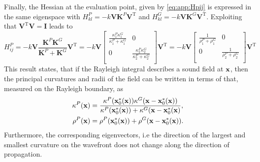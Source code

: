 Finally, the Hessian at the evaluation point, given by \eqref{eq:app:Hpij} is expressed in the same eigenspace with $H^P_{kl} = -k \mathbf{V} \mathbf{K}^P \mathbf{V}^{\mathrm{T}}$ and $H^G_{kl} = -k \mathbf{V} \mathbf{K}^G \mathbf{V}^{\mathrm{T}}$.
Exploiting that $\mathbf{V}^{\mathrm{T}}\mathbf{V} = \mathbf{I}$ leads to
\begin{equation}
H_{ij}^P = 
-k \mathbf{V} \frac{ \mathbf{K}^P \mathbf{K}^G  }{\mathbf{K}^P + \mathbf{K}^G }   \mathbf{V}^{\mathrm{T}} =
-k \mathbf{V} 
\begin{bmatrix}
\frac{\kappa_1^P \kappa_1^G}{\kappa_1^P + \kappa_1^G} & 0 \\[.5em]
0 & \frac{\kappa_2^P \kappa_2^G}{\kappa_2^P + \kappa_2^G}
\\[0.3em]    \end{bmatrix}
\mathbf{V}^{\mathrm{T}}
=
-k \mathbf{V} 
\begin{bmatrix}
\frac{1}{\rho_1^P+\rho_1^G} & 0 \\[.5em]
0 & \frac{1}{\rho_2^P+\rho_2^G}
\\[0.3em]    \end{bmatrix}
\mathbf{V}^{\mathrm{T}}
\end{equation}
This result states, that if the Rayleigh integral describes a sound field at $\mathbf{x}$, then the principal curvatures and radii of the field can be written in terms of that, measured on the Rayleigh boundary, as
\begin{align}
\label{eq:app:propagated_radii}
\kappa^P(\mathbf{x}) &= \frac{\kappa^P(\mathbf{x}_0^*(\mathbf{x})) \kappa^G(\mathbf{x}-\mathbf{x}_0^*(\mathbf{x})) }{\kappa^P(\mathbf{x}_0^*(\mathbf{x})) + \kappa^G(\mathbf{x}-\mathbf{x}_0^*(\mathbf{x})}, \\
\rho^P(\mathbf{x}) &= \rho^P(\mathbf{x}_0^*(\mathbf{x})) + \rho^G(\mathbf{x}-\mathbf{x}_0^*(\mathbf{x})). 
\end{align}
Furthermore, the corresponding eigenvectors, i.e the direction of the largest and smallest curvature on the wavefront does not change along the direction of propagation.

\vspace{3mm}
